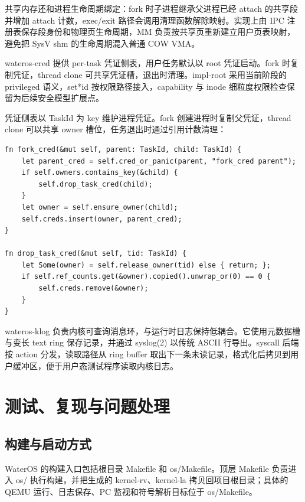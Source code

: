 \documentclass[12pt,openany,oneside,AutoFakeBold=true]{ctexbook}
\newcommand{\code}[1]{\textnormal{\rmfamily #1}}
\begin{document}
共享内存还和进程生命周期绑定：fork 时子进程继承父进程已经 attach 的共享段并增加 attach 计数，exec/exit 路径会调用清理函数解除映射。实现上由 IPC 注册表保存段身份和物理页生命周期，MM 负责按共享页重新建立用户页表映射，避免把 SysV shm 的生命周期混入普通 COW VMA。

\code{wateros-cred} 提供 per-task 凭证侧表，用户任务默认以 root 凭证启动。fork 时复制凭证，thread clone 可共享凭证槽，退出时清理。\code{impl-root} 采用当前阶段的 privileged 语义，set*id 按权限路径接入，capability 与 inode 细粒度权限检查保留为后续安全模型扩展点。


凭证侧表以 \code{TaskId} 为 key 维护进程凭证。fork 创建进程时复制父凭证，thread clone 可以共享 owner 槽位，任务退出时通过引用计数清理：

\begin{lstlisting}
fn fork_cred(&mut self, parent: TaskId, child: TaskId) {
    let parent_cred = self.cred_or_panic(parent, "fork_cred parent");
    if self.owners.contains_key(&child) {
        self.drop_task_cred(child);
    }
    let owner = self.ensure_owner(child);
    self.creds.insert(owner, parent_cred);
}

fn drop_task_cred(&mut self, tid: TaskId) {
    let Some(owner) = self.release_owner(tid) else { return; };
    if self.ref_counts.get(&owner).copied().unwrap_or(0) == 0 {
        self.creds.remove(&owner);
    }
}
\end{lstlisting}

\code{wateros-klog} 负责内核可查询消息环，与运行时日志保持低耦合。它使用元数据槽与变长 text ring 保存记录，并通过 \code{syslog(2)} 以传统 ASCII 行导出。syscall 后端按 action 分发，读取路径从 ring buffer 取出下一条未读记录，格式化后拷贝到用户缓冲区，便于用户态测试程序读取内核日志。



\chapter{测试、复现与问题处理}

\section{构建与启动方式}

WaterOS 的构建入口包括根目录 \code{Makefile} 和 \code{os/Makefile}。顶层 \code{Makefile} 负责进入 \code{os/} 执行构建，并把生成的 \code{kernel-rv}、\code{kernel-la} 拷贝回项目根目录；具体的 QEMU 运行、日志保存、PC 监视和符号解析目标位于 \code{os/Makefile}。
\end{document}
